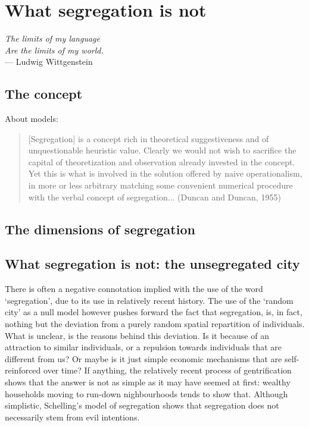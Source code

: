\chapter{What segregation is not}

\begin{flushright}{\slshape    
The limits of my language\\
Are the limits of my world.} \\ \medskip
--- Ludwig Wittgenstein 
\end{flushright}


\bigskip


\section{The concept}
\label{sec:introduction}

About models: \cite{Gauvin:2013, Brueckner:1999, Glaeser:2008}

\begin{quote}
    [Segregation] is a concept rich in theoretical suggestiveness and of
    unquestionable heuristic value. Clearly we would not wish to sacrifice the
    capital of theoretization and observation already invested in the concept.
    Yet this is what is involved in the solution offered by naive
    operationalism, in more or less arbitrary matching some convenient numerical
    procedure with the verbal concept of segregation... (Duncan and Duncan, 1955)
\end{quote}

\section{The dimensions of segregation}
\label{sec:the_dimensions_of_segregation}


\section{What segregation is not: the unsegregated city}
\label{sec:null_model_the_unsegregated_city}

There is often a negative connotation implied with the use of the word
`segregation', due to its use in relatively recent history. The use of the
`random city' as a null model however pushes forward the fact that segregation,
is, in fact, nothing but the deviation from a purely random spatial repartition
of individuals. What is unclear, is the reasons behind this deviation. Is it
because of an attraction to similar individuals, or a repulsion towards
individuals that are different from us? Or maybe is it just simple economic
mechanisms that are self-reinforced over time? If anything, the relatively
recent process of gentrification shows that the answer is not as simple as it
may have seemed at first: wealthy households moving to run-down nighbourhoods
tends to show that. Although
simplistic, Schelling's model of segregation shows that segregation does not
necessarily stem from evil intentions.

